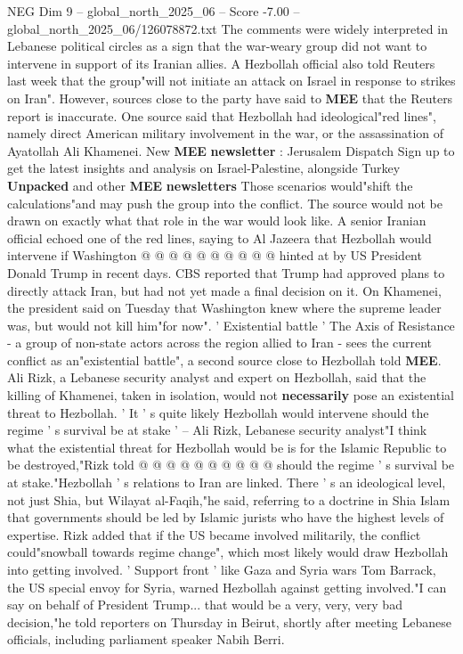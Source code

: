 \begin{textsample}{NEG Dim 9 – global\_north\_2025\_06 – Score -7.00 – global\_north\_2025\_06/126078872.txt}  \label{ex:f9_neg_076}
The comments were widely interpreted in Lebanese political circles as a sign that the war-weary group did not want to intervene in support of its Iranian allies.
A Hezbollah official also told Reuters last week that the group"will not initiate an attack on Israel in response to strikes on Iran".
However, sources close to the party have said to \textbf{MEE} that the Reuters report is inaccurate.
One source said that Hezbollah had ideological"red lines", namely direct American military involvement in the war, or the assassination of Ayatollah Ali Khamenei.
New \textbf{MEE} \textbf{newsletter} : Jerusalem Dispatch Sign up to get the latest insights and analysis on Israel-Palestine, alongside Turkey \textbf{Unpacked} and other \textbf{MEE} \textbf{newsletters} Those scenarios would"shift the calculations"and may push the group into the conflict.
The source would not be drawn on exactly what that role in the war would look like.
A senior Iranian official echoed one of the red lines, saying to Al Jazeera that Hezbollah would intervene if Washington @ @ @ @ @ @ @ @ @ @ hinted at by US President Donald Trump in recent days.
CBS reported that Trump had approved plans to directly attack Iran, but had not yet made a final decision on it.
On Khamenei, the president said on Tuesday that Washington knew where the supreme leader was, but would not kill him"for now". ' Existential battle ' The Axis of Resistance - a group of non-state actors across the region allied to Iran - sees the current conflict as an"existential battle", a second source close to Hezbollah told \textbf{MEE}.
Ali Rizk, a Lebanese security analyst and expert on Hezbollah, said that the killing of Khamenei, taken in isolation, would not \textbf{necessarily} pose an existential threat to Hezbollah. ' It ' s quite likely Hezbollah would intervene should the regime ' s survival be at stake ' -- Ali Rizk, Lebanese security analyst"I think what the existential threat for Hezbollah would be is for the Islamic Republic to be destroyed,"Rizk told @ @ @ @ @ @ @ @ @ @ should the regime ' s survival be at stake."Hezbollah ' s relations to Iran are linked.
There ' s an ideological level, not just Shia, but Wilayat al-Faqih,"he said, referring to a doctrine in Shia Islam that governments should be led by Islamic jurists who have the highest levels of expertise.
Rizk added that if the US became involved militarily, the conflict could"snowball towards regime change", which most likely would draw Hezbollah into getting involved. ' Support front ' like Gaza and Syria wars Tom Barrack, the US special envoy for Syria, warned Hezbollah against getting involved."I can say on behalf of President Trump... that would be a very, very, very bad decision,"he told reporters on Thursday in Beirut, shortly after meeting Lebanese officials, including parliament speaker Nabih Berri.

\end{textsample}
